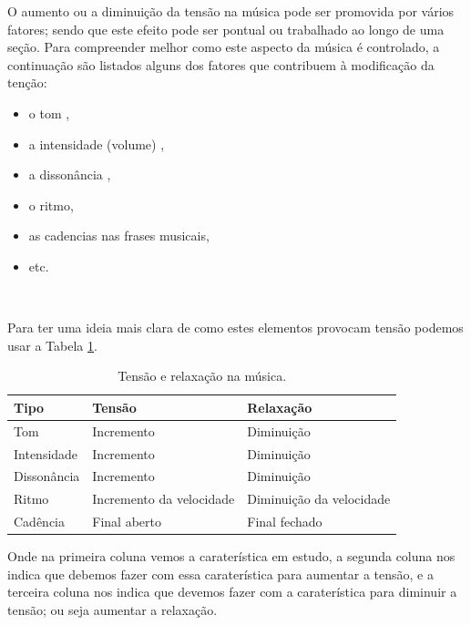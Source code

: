 O aumento ou a diminuição da tensão na música pode ser promovida por vários fatores; 
sendo que este efeito pode ser pontual ou trabalhado ao longo de uma seção.
Para compreender melhor como este aspecto da música  é controlado,
 a continuação são listados alguns dos fatores que contribuem à modificação da tenção:
\begin{itemize}
\item o tom \cite[pp. 3]{wright2012essential},
\item a intensidade (volume) \cite[pp. 3]{wright2012essential},
\item a dissonância \cite[pp. 28-29]{kerman2015listen} \cite[pp. 26]{wright2012essential},
\item o ritmo, 
\item as cadencias nas frases musicais,
\item etc.
\end{itemize}~

Para ter uma ideia mais clara de como estes elementos provocam tensão podemos usar a Tabela  \ref{tab:tensionrelease1}.  
\begin{table}[h]
  \centering
  \begin{tabular}{| p{3cm} || p{3.0cm} | p{3.0cm} |}
   \hline 
   Tipo & Tensão     & Relaxação \\ \hline 
   \hline 
   Tom          & Incremento & Diminuição  \\ \hline
   Intensidade  & Incremento & Diminuição  \\ \hline
   Dissonância  & Incremento & Diminuição  \\ \hline
   Ritmo        & Incremento da velocidade & Diminuição da velocidade \\ \hline
   Cadência     & Final aberto & Final fechado \\ \hline
  \end{tabular}
  \caption{Tensão e relaxação na música.}
  \label{tab:tensionrelease1}
\end{table}
Onde na primeira coluna  vemos a caraterística em estudo,
a segunda coluna nos indica que debemos fazer com essa caraterística para aumentar a tensão,
e a terceira coluna nos indica que devemos fazer com a caraterística para diminuir a tensão;
ou seja aumentar a relaxação.

